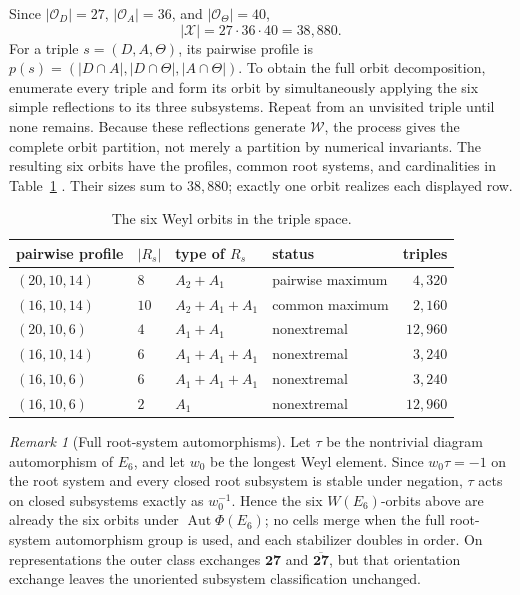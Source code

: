 \documentclass[11pt]{article}
\theoremstyle{remark}
\newtheorem*{remark}{Remark}
\begin{document}
Since \(|\mathcal O_D|=27\), \(|\mathcal O_A|=36\), and
\(|\mathcal O_\Theta|=40\),
\[
 |\mathcal X|=27\cdot36\cdot40=38{,}880.
\]
For a triple \(s=(D,A,\Theta)\), its pairwise profile is
\(p(s)=(|D\cap A|,|D\cap\Theta|,|A\cap\Theta|)\).
To obtain the full orbit decomposition, enumerate every triple and form
its orbit by simultaneously applying the six simple reflections to its
three subsystems. Repeat from an unvisited triple until none remains.
Because these reflections generate \(\mathcal W\), the process gives the
complete orbit partition, not merely a partition by numerical invariants.
The resulting six orbits have the profiles, common root systems, and
cardinalities in Table~\ref{tab:complete-e6-cells}
\cite{ComputationalCompanion}. Their sizes sum to \(38{,}880\); exactly
one orbit realizes each displayed row.

\begin{table}[H]
\centering
\caption{The six Weyl orbits in the triple space.}
\label{tab:complete-e6-cells}
\small
\begin{tabular}{@{}llllr@{}}
\toprule
pairwise profile & \(|R_s|\) & type of \(R_s\) & status & triples\\
\midrule
\((20,10,14)\) & \(8\)  & \(A_2+A_1\)       & pairwise maximum & \(4{,}320\)\\
\((16,10,14)\) & \(10\) & \(A_2+A_1+A_1\)   & common maximum   & \(2{,}160\)\\
\((20,10,6)\)  & \(4\)  & \(A_1+A_1\)       & nonextremal      & \(12{,}960\)\\
\((16,10,14)\) & \(6\)  & \(A_1+A_1+A_1\)   & nonextremal      & \(3{,}240\)\\
\((16,10,6)\)  & \(6\)  & \(A_1+A_1+A_1\)   & nonextremal      & \(3{,}240\)\\
\((16,10,6)\)  & \(2\)  & \(A_1\)           & nonextremal      & \(12{,}960\)\\
\bottomrule
\end{tabular}
\end{table}

\begin{remark}[Full root-system automorphisms]
Let \(\tau\) be the nontrivial diagram automorphism of \(E_6\), and let
\(w_0\) be the longest Weyl element.  Since \(w_0\tau=-1\) on the root
system and every closed root subsystem is stable under negation, \(\tau\)
acts on closed subsystems exactly as \(w_0^{-1}\).  Hence the six
\(W(E_6)\)-orbits above are already the six orbits under
\(\operatorname{Aut}\Phi(E_6)\); no cells merge when the full root-system
automorphism group is used, and each stabilizer doubles in order.  On
representations the outer class exchanges \(\mathbf{27}\) and
\(\overline{\mathbf{27}}\), but that orientation exchange leaves the
unoriented subsystem classification unchanged.
\end{remark}
\end{document}
